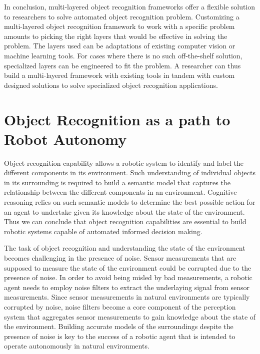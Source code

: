In conclusion, multi-layered object recognition frameworks offer a flexible solution to researchers to solve automated object recognition problem. Customizing a multi-layered object recognition framework to work with a specific problem amounts to picking the right layers that would be effective in solving the problem. The layers used can be adaptations of existing computer vision or machine learning tools. For cases where there is no such off-the-shelf solution, specialized layers can be engineered to fit the problem. A researcher can thus build a multi-layered framework with existing tools in tandem with custom designed solutions to solve specialized object recognition applications.

\section{Object Recognition as a path to Robot Autonomy}

Object recognition capability allows a robotic system to identify and label the different components in its environment. Such understanding of individual objects in its surrounding is required to build a semantic model that captures the relationship between the different components in an environment.
Cognitive reasoning relies on such semantic models to determine the best possible action for an agent to undertake given its knowledge about the state of the environment. Thus we can conclude that object recognition capabilities are essential to build robotic systems capable of automated informed decision making.

The task of object recognition and understanding the state of the environment becomes challenging in the presence of noise. Sensor measurements
that are supposed to measure the state of the environment could be corrupted due to the presence of noise. In order to avoid being misled by bad measurements,
a robotic agent needs to employ noise filters to extract the underlaying signal from sensor measurements. Since sensor measurements in natural environments are typically corrupted by noise, noise filters become a core component of the perception system that aggregates sensor measurements to gain knowledge about the state of the environment. Building accurate models of the surroundings despite the presence of noise is key to the success of a robotic agent that is intended to operate autonomously in natural environments.

